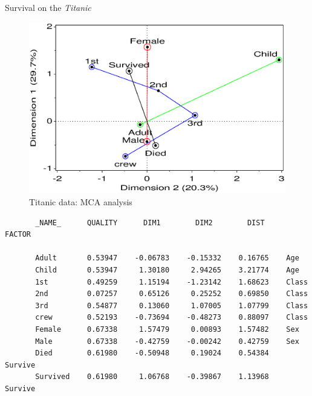\begin{Example}[titanic2]{Survival on the \emph{Titanic}}
\begin{figure}[htb]
  \centering
  \includegraphics[scale=.8,clip]{ch5/fig/titanicmca}
  \caption{Titanic data: MCA analysis}\label{fig:titanicmca}
\end{figure}



\begin{Output}[htb]
\caption{\CA\ coordinates for \emph{Titanic} MCA}\label{out:titanicmca2}
\begin{verbatim}
       _NAME_      QUALITY      DIM1        DIM2        DIST     FACTOR

       Adult       0.53947    -0.06783    -0.15332    0.16765    Age
       Child       0.53947     1.30180     2.94265    3.21774    Age
       1st         0.49259     1.15194    -1.23142    1.68623    Class
       2nd         0.07257     0.65126     0.25252    0.69850    Class
       3rd         0.54877     0.13060     1.07005    1.07799    Class
       crew        0.52193    -0.73694    -0.48273    0.88097    Class
       Female      0.67338     1.57479     0.00893    1.57482    Sex
       Male        0.67338    -0.42759    -0.00242    0.42759    Sex
       Died        0.61980    -0.50948     0.19024    0.54384    Survive
       Survived    0.61980     1.06768    -0.39867    1.13968    Survive
\end{verbatim}
\end{Output}


\end{Example}
